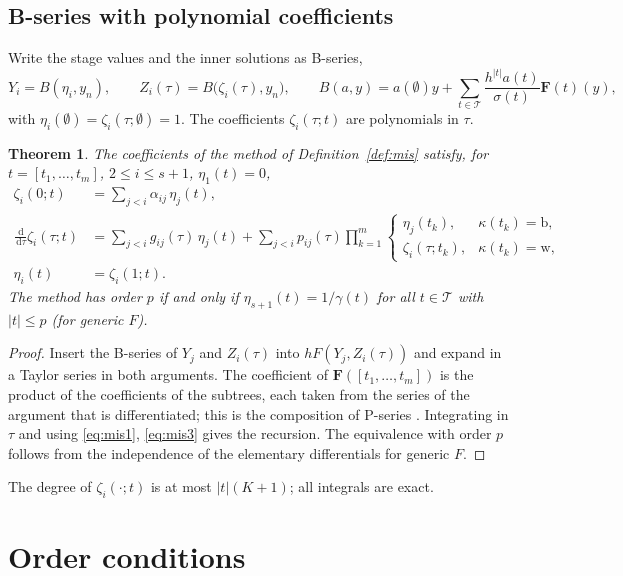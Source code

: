 \documentclass[11pt,a4paper]{article}
\newtheorem{theorem}{Theorem}[section]
\theoremstyle{definition}
\theoremstyle{remark}
\newcommand{\T}{\mathcal{T}}
\newcommand{\dd}{\,\mathrm{d}}
\begin{document}
\subsection{B-series with polynomial coefficients}

Write the stage values and the inner solutions as B-series,
\[
 Y_i=B(\eta_i,y_n),\qquad Z_i(\tau)=B\big(\zeta_i(\tau),y_n\big),\qquad
 B(a,y)=a(\emptyset)y+\sum_{t\in\T}\frac{h^{|t|}a(t)}{\sigma(t)}\mathbf F(t)(y),
\]
with $\eta_i(\emptyset)=\zeta_i(\tau;\emptyset)=1$. The coefficients $\zeta_i(\tau;t)$ are polynomials in $\tau$.

\begin{theorem}\label{thm:recursion}
The coefficients of the method of Definition~\ref{def:mis} satisfy, for $t=[t_1,\dots,t_m]$, $2\le i\le s+1$,
$\eta_1(t)=0$,
\begin{align*}
 \zeta_i(0;t) &= \sum_{j<i}\alpha_{ij}\,\eta_j(t),\\
 \frac{\dd}{\dd\tau}\zeta_i(\tau;t) &= \sum_{j<i}g_{ij}(\tau)\,\eta_j(t)
   + \sum_{j<i}p_{ij}(\tau)\prod_{k=1}^m\begin{cases}\eta_j(t_k), & \kappa(t_k)=\mathrm b,\\
                  \zeta_i(\tau;t_k), & \kappa(t_k)=\mathrm w,\end{cases}\\
 \eta_i(t) &= \zeta_i(1;t).
\end{align*}
The method has order $p$ if and only if $\eta_{s+1}(t)=1/\gamma(t)$ for all $t\in\T$ with $|t|\le p$ (for generic $F$).
\end{theorem}

\begin{proof}
Insert the B-series of $Y_j$ and $Z_i(\tau)$ into $hF(Y_j,Z_i(\tau))$ and expand in a Taylor series in both arguments.
The coefficient of $\mathbf F([t_1,\dots,t_m])$ is the product of the coefficients of the subtrees, each taken from the
series of the argument that is differentiated; this is the composition of P-series \cite{HairerNorsettWanner1993}.
Integrating in $\tau$ and using \eqref{eq:mis1}, \eqref{eq:mis3} gives the recursion. The equivalence with order $p$
follows from the independence of the elementary differentials for generic $F$.
\end{proof}

The degree of $\zeta_i(\cdot;t)$ is at most $|t|(K+1)$; all integrals are exact.

\section{Order conditions}
\label{sec:oc}
\end{document}
